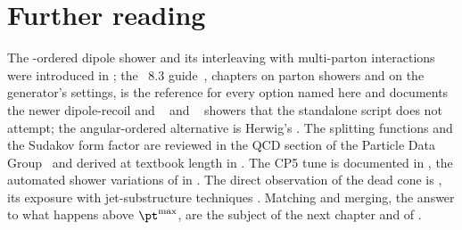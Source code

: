 \section{Further reading}
\label{sec:mother_gives_birth:further_reading}
The \pt-ordered dipole shower and its interleaving with multi-parton
interactions were introduced in \cite{Sjostrand:2004ef}; the \PYTHIA~8.3
guide~\cite{Bierlich:2022pfr}, chapters on parton showers and on the
generator's settings, is the reference for every option named here and
documents the newer dipole-recoil and ~\cite{Fischer:2016vfv}
and ~\cite{Hoche:2015sya} showers that the standalone script
does not attempt; the angular-ordered alternative is Herwig's
\cite{Bellm:2019zci}. The splitting functions and the Sudakov form factor
are reviewed in the QCD section of the Particle Data
Group~\cite{ParticleDataGroup:2024cfk} and derived at textbook length in
\cite{Ellis:1996mzs}. The CP5 tune is documented in \cite{CMS:2019csb}, the
automated shower variations of \PYTHIA in \cite{Mrenna:2016sih}. The direct
observation of the dead cone is \cite{ALICE:2021aqk}, its exposure with
jet-substructure techniques \cite{Maltoni:2016ays}. Matching and merging,
the answer to what happens above $\pt^{\max}$, are the subject of the next
chapter and of \cite{Mangano:2006rw,Frederix:2012ps,Lonnblad:2001iq}.

